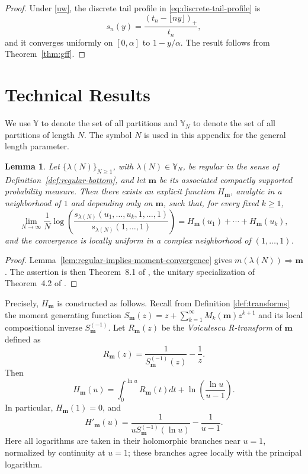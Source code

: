 \documentclass[11pt]{amsart}
\theoremstyle{plain}
\newtheorem{lemma}[theorem]{Lemma}
\newcommand\YY{{\mathbb {Y}}}
\newcommand\bm{\mathbf{m}}
\numberwithin{equation}{section}
\numberwithin{theorem}{section}
\numberwithin{figure}{section}
\begin{document}
\begin{proof}
Under \eqref{uw}, the discrete tail profile in
\eqref{eq:discrete-tail-profile} is
\[
    s_n(y)
    =
    \frac{(t_n-\lfloor ny\rfloor)_+}{t_n},
\]
and it converges uniformly on $[0,\alpha]$ to
$1-y/\alpha$. The result follows from
Theorem~\ref{thm:gff}.
\end{proof}


\appendix
\section{Technical Results}\label{sa}

We use $\YY$ to denote the set of all   partitions and $\YY_N$ to denote the set of all   partitions of length $N$.  The symbol $N$ is used in this appendix for the general length parameter.
 

\begin{lemma}\label{la1}
Let $\{\lambda(N)\}_{N\geq1}$, with $\lambda(N)\in\YY_N$, be regular in the sense of
Definition~\ref{def:regular-bottom}, and let $\bm$ be its associated
compactly supported probability measure.
Then there exists an explicit function $H_{\bm}$, analytic in a
neighborhood of $1$ and depending only on $\bm$, such that, for every
fixed $k\geq1$,
\begin{equation}
  \lim_{N\rightarrow\infty}
  \frac{1}{N} \log\left(%
  \frac{s_{\lambda(N)}(u_1,\ldots,u_k,1,\ldots,1)}{s_{\lambda(N)}(1,\ldots,1)}
  \right) = H_{\bm}(u_1)+\cdots+H_{\bm}(u_k),
  \label{nlc}
\end{equation}
and the convergence is locally uniform in a complex neighborhood of
$(1,\dotsc,1)$.
\end{lemma}

\begin{proof}
Lemma~\ref{lem:regular-implies-moment-convergence} gives
$m(\lambda(N))\Longrightarrow\bm$. The assertion is then
Theorem~8.1 of \cite{bg16}, the unitary specialization of
Theorem~4.2 of \cite{bg}.
\end{proof}

Precisely, $H_{\bm}$ is constructed as follows.  Recall from Definition
\ref{def:transforms} the moment generating function
$S_{\bm}(z)=z+\sum_{k=1}^\infty M_k(\bm)z^{k+1}$ and its local compositional
inverse $S_{\bm}^{(-1)}$.  Let $R_{\bm}(z)$ be the
\emph{Voiculescu R-transform} of $\bm$ defined as
\begin{equation*}
  R_{\bm}(z) = \frac{1}{S_\bm^{(-1)}(z)} - \frac{1}{z}.
\end{equation*}
Then
\begin{equation}
  \label{hmz}
  H_{\bm}(u) = \int_{0}^{\ln u} R_\bm(t)dt+ \ln\left( \frac{\ln u}{u-1} \right).
\end{equation}
In particular, $H_{\bm}(1)=0$, and
\begin{equation}
  H'_\bm(u) = \frac{1}{u S_\bm^{(-1)}(\ln u)} - \frac{1}{u-1}.\label{hmd}
\end{equation}
Here all logarithms are taken in their holomorphic branches near
\(u=1\), normalized by continuity at \(u=1\); these branches agree
locally with the principal logarithm.
\end{document}
